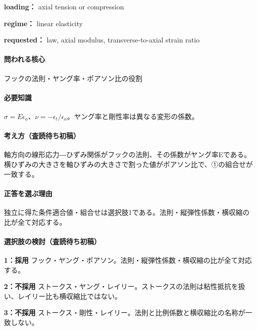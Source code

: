 \noindent\textbf{loading：} axial tension or compression\par

\noindent\textbf{regime：} linear elasticity\par

\noindent\textbf{requested：} law, axial modulus, transverse-to-axial strain ratio\par

\paragraph{問われる核心} フックの法則・ヤング率・ポアソン比の役割

\paragraph{必要知識} \(\sigma=E\epsilon_a\)、\(\nu=-\epsilon_t/\epsilon_a\)。ヤング率と剛性率は異なる変形の係数。

\paragraph{考え方（査読待ち初稿）} 軸方向の線形応力―ひずみ関係がフックの法則、その係数がヤング率Eである。横ひずみの大きさを軸ひずみの大きさで割った値がポアソン比で、①の組合せが一致する。

\paragraph{正答を選ぶ理由} 独立に得た条件適合値・組合せは選択肢1である。法則・縦弾性係数・横収縮の比が全て対応する。

\paragraph{選択肢の検討（査読待ち初稿）}\mbox{}\par

\noindent\textbf{1：採用} フック・ヤング・ポアソン。法則・縦弾性係数・横収縮の比が全て対応する。\par

\noindent\textbf{2：不採用} ストークス・ヤング・レイリー。ストークスの法則は粘性抵抗を扱い、レイリー比も横収縮比ではない。\par

\noindent\textbf{3：不採用} ストークス・剛性・レイリー。法則と比例係数と横収縮比の名称が一致しない。\par

